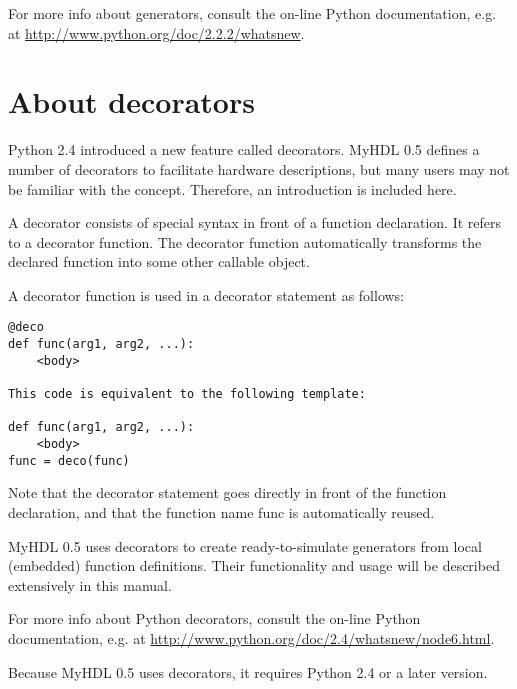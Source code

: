 For more info about generators, consult the on-line Python
documentation, e.g. at \url{http://www.python.org/doc/2.2.2/whatsnew}. 


\section{About decorators \label{deco}}

Python 2.4 introduced a new feature called decorators. MyHDL 0.5 defines
a number of decorators to facilitate hardware descriptions, but many users may
not be familiar with the concept. Therefore, an introduction
is included here.

A decorator consists of special syntax in front of a function
declaration. It refers to a decorator function. The decorator
function automatically transforms the declared function into some
other callable object.

A decorator function  is used in a decorator statement as follows:

\begin{verbatim}
@deco
def func(arg1, arg2, ...):
    <body>

This code is equivalent to the following template:

def func(arg1, arg2, ...):
    <body>
func = deco(func)
\end{verbatim}

Note that the decorator statement goes directly in front of the
function declaration, and that the function name func is automatically
reused.

MyHDL 0.5 uses decorators to create ready-to-simulate generators
from local (embedded) function definitions. Their functionality
and usage will be described extensively in this manual.

For more info about Python decorators, consult the on-line Python
documentation, e.g. at \url{http://www.python.org/doc/2.4/whatsnew/node6.html}.

\begin{notice}[warning]
Because MyHDL 0.5 uses decorators, it requires Python 2.4 or a
later version.
\end{notice}
